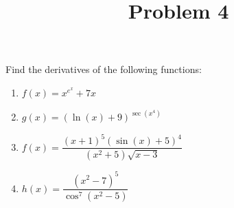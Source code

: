 \documentclass{ximera}
\title[Problem 4]{Problem 4}
\begin{document}
\begin{abstract} \end{abstract}
\maketitle

\begin{problem}
Find the derivatives of the following functions:
	\begin{enumerate}
	
	\item  $f(x) = x^{e^x} + 7x$
\item  $g(x) = (\ln(x) + 9)^{\sec(x^4)}$\\
\item  $f(x) = \dfrac{(x+1)^5(\sin(x)+5)^4}{(x^2 + 5)\sqrt{x-3}}$
	\item  $h(x) = \dfrac{(x^2 - 7)^5}{\cos^7(x^2 - 5)}$
\end{enumerate}
\end{problem}
\end{document}
